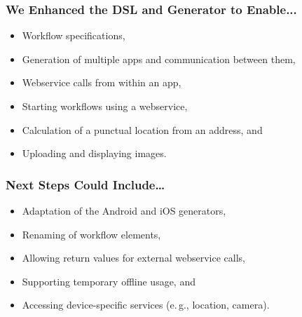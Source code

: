 \begin{frame}
    \frametitle{We Enhanced the DSL and Generator to Enable...}
    
    \begin{itemize}
    	\item Workflow specifications,
    	\item Generation of multiple apps and communication between them,
    	\item Webservice calls from within an app,
    	\item Starting workflows using a webservice,
    	\item Calculation of a punctual location from an address, and
    	\item Uploading and displaying images.
    \end{itemize}

\end{frame}

\begin{frame}
    \frametitle{Next Steps Could Include\dots}

	\begin{itemize}
		\item Adaptation of the Android and iOS generators,
		\item Renaming of workflow elements,
		\item Allowing return values for external webservice calls,
		\item Supporting temporary offline usage, and
		\item Accessing device-specific services (e.\,g., location, camera).
	\end{itemize}
\end{frame}

